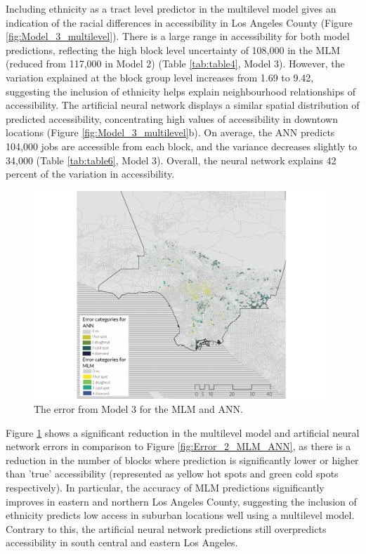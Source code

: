 \documentclass[a4paper,UKenglish]{lipics-v2018}
\begin{document}
Including ethnicity as a tract level predictor in the multilevel model gives an indication of the racial differences in accessibility in Los Angeles County (Figure \ref{fig:Model_3_multilevel}). There is a large range in accessibility for both model predictions, reflecting the high block level uncertainty of 108,000 in the MLM (reduced from 117,000 in Model 2) (Table \ref{tab:table4}, Model 3). However, the variation explained at the block group level increases from 1.69 to 9.42, suggesting the inclusion of ethnicity helps explain neighbourhood relationships of accessibility. The artificial neural network displays a similar spatial distribution of predicted accessibility, concentrating high values of accessibility in downtown locations (Figure \ref{fig:Model_3_multilevel}b). On average, the ANN predicts 104,000 jobs are accessible from each block, and the variance decreases slightly to 34,000 (Table \ref{tab:table6}, Model 3). Overall, the neural network explains 42 percent of the variation in accessibility.  
\begin{figure}[H]
    \centering
    \includegraphics[width=0.99\textwidth]{Error/Error_3_MLM_ANN.pdf}
    \caption[Model 3 error]{The error from Model 3 for the MLM and ANN.} 
    \label{fig:Error_3_MLM_ANN}
\end{figure}

Figure \ref{fig:Error_3_MLM_ANN} shows a significant reduction in the multilevel model and artificial neural network errors in comparison to Figure \ref{fig:Error_2_MLM_ANN}, as there is a reduction in the number of blocks where prediction is significantly lower or higher than 'true' accessibility (represented as yellow hot spots and green cold spots respectively). In particular, the accuracy of MLM predictions significantly improves in eastern and northern Los Angeles County, suggesting the inclusion of ethnicity predicts low access in suburban locations well using a multilevel model. Contrary to this, the artificial neural network predictions still overpredicts accessibility in south central and eastern Los Angeles. 
\end{document}
